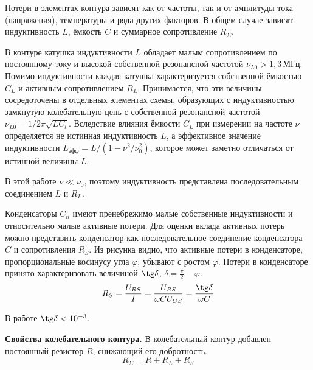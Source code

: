 Потери в элементах контура зависят как от частоты, так и от амплитуды тока (напряжения),  температуры и ряда других факторов. В общем случае зависят индуктивность $L$, ёмкость $C$ и суммарное сопротивление $R_{ \Sigma }$.

В контуре катушка индуктивности $L$ обладает малым сопротивлением по постоянному току и высокой собственной резонансной частотой $ \nu_{L0}>1{,}3\,\text{МГц}$.
Помимо индуктивности каждая катушка характеризуется собственной ёмкостью $C_{L}$ и активным сопротивлением $R_{L}$. Принимается, что эти величины сосредоточены в отдельных элементах схемы, образующих с индуктивностью
замкнутую колебательную цепь с собственной резонансной частотой $ \nu_{L0}=1/2 \pi \sqrt{LC_{l}}$.
Вследствие влияния ёмкости $C_{L}$ при измерении на частоте $ \nu $ определяется не истинная индуктивность $L$, а эффективное значение индуктивности $L_{\text{эфф}}=L/\left(1- \nu^{2}/\nu^{2}_{0}\right)$,  которое может заметно
отличаться от истинной величины $L$.

В этой работе $ \nu \ll \nu_{0}$, поэтому индуктивность представлена последовательным соединением $L$ и $R_{L}$.

\begin{figure}[ht!]
\end{figure}

Конденсаторы $C_{n}$ имеют пренебрежимо малые собственные индуктивности и относительно малые активные потери. Для оценки вклада активных потерь можно представить конденсатор как последовательное соединение конденсатора
$C$ и сопротивления $R_{S}$. Из рисунка видно, что активные потери в конденсаторе, пропорциональные косинусу угла $ \varphi $, убывают с ростом $ \varphi $. Потери в конденсаторе принято характеризовать величиной
$\tg \delta $, $ \delta = \frac{ \pi }{2} - \varphi $.
\[
    R_{S} = \frac{U_{RS}}{I} = \frac{U_{RS}}{ \omega C U_{CS}} = \frac{\tg \delta }{ \omega C}
\]

В работе $\tg \delta < 10^{-3}$.

\textbf{Свойства колебательного контура.} В колебательный контур добавлен постоянный резистор $R$, снижающий его добротность.
\[
    R_{ \Sigma } = R + R_{L} + R_{S}
\]

